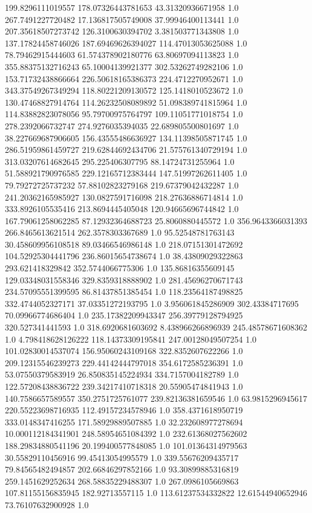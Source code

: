 199.8296111019557	178.07326443781653	43.31320936671958	1.0
267.7491227720482	17.136817505749008	37.99946400113441	1.0
207.35618507273742	126.3100630394702	3.381503771343808	1.0
137.17824458746026	187.69469626394027	114.47013053625088	1.0
78.79462915444603	61.574378902180776	63.80697094113823	1.0
355.88375132716243	65.10004139921377	302.53262749282106	1.0
153.71732438866664	226.50618165386373	224.4712270952671	1.0
343.37549267349294	118.80221209130572	125.1418010523672	1.0
130.47468827914764	114.26232508089892	51.098389741815964	1.0
114.83882823078056	95.79700975764797	109.11051771018754	1.0
278.2392066732747	274.9276035394035	22.689805500801697	1.0
38.227669687906605	156.43555486636927	134.11398505871745	1.0
286.51959861459727	219.62844692434706	21.575761340729194	1.0
313.03207614682645	295.225406307795	88.14724731255964	1.0
51.588921790976585	229.12165712383444	147.51997262611405	1.0
79.79272725737232	57.88102823279168	219.67379042432287	1.0
241.20362165985927	130.0827591716098	218.27636886714814	1.0
333.8926105535416	213.8694445405048	120.94665696744842	1.0
167.79061258062285	87.12932364688723	25.8060880445572	1.0
356.9643366031393	266.8465613621514	262.3578303367689	1.0
95.52548781763143	30.458609956108518	89.03466546986148	1.0
218.07151301472692	104.52925304441796	236.86015654738674	1.0
38.43809029322863	293.621418329842	352.5744066775306	1.0
135.86816355609145	129.03348031558346	329.8359318888902	1.0
281.45696270671743	234.57095551399595	86.81437851385454	1.0
118.23564187498825	332.4744052327171	37.03351272193795	1.0
3.956061845286909	302.43384717695	70.09966774686404	1.0
235.17382209943347	256.39779128794925	320.527341441593	1.0
318.6920681603692	8.438966266896939	245.48578671608362	1.0
4.798418628126222	118.14373309195841	247.00128049507254	1.0
101.02830014537074	156.95060243109168	322.8352607622266	1.0
209.12315546239273	229.44142444797018	354.6172585236391	1.0
53.07550379583919	26.850835145224934	334.7157004182789	1.0
122.57208438836722	239.34217410718318	20.55905474841943	1.0
140.7586657589557	350.2751725761077	239.82136381659546	1.0
63.9815296945617	220.55223698716935	112.49157234578946	1.0
358.4371618950719	333.0148347416255	171.58929889507885	1.0
32.232608977278694	10.000112184341901	248.58954651084392	1.0
232.61368027562602	188.29834880541196	20.199400577848085	1.0
101.01364314979563	30.55829110456916	99.45413054995579	1.0
339.55676209435717	79.84565482494857	202.66846297852166	1.0
93.30899885316819	259.1451629252634	268.58835229488307	1.0
267.0986105669863	107.81155156835945	182.92713557115	1.0
113.61237534332822	12.61544940652946	73.76107632900928	1.0
